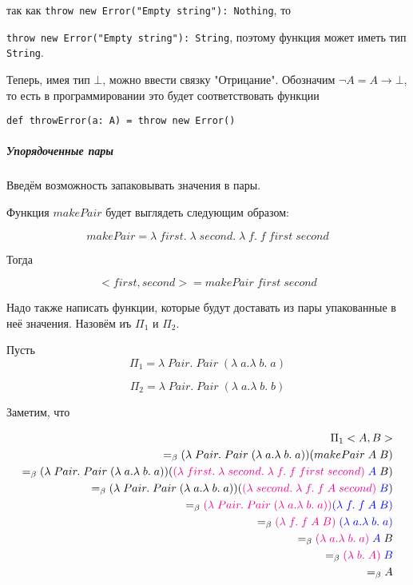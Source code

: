 так как \texttt{throw new Error("Empty string"): Nothing}, то 

\texttt{throw new Error("Empty string"): String}, поэтому функция может иметь тип \texttt{String}.

Теперь, имея тип $\bot$, можно ввести связку "Отрицание". Обозначим $\neg A = A \rightarrow \bot$, то есть в программировании это будет соответствовать функции

\begin{verbatim}
def throwError(a: A) = throw new Error()
\end{verbatim}

\subparagraph{Упорядоченные пары}

Введём возможность запаковывать значения в пары.

Функция $makePair$ будет выглядеть следующим образом:

$$makePair = \lambda \; first. \; \lambda \; second. \; \lambda \; f. \; f \; first \; second$$

Тогда 

$$<first, second> = makePair \; first \; second$$

Надо также написать функции, которые будут доставать из пары упакованные в неё значения. Назовём иъ $\Pi_1$ и $\Pi_2$. 

Пусть 
$$\Pi_1 = \lambda \; Pair. \; Pair \; (\lambda \; a. \lambda \; b. \; a)$$

$$\Pi_2 = \lambda \; Pair. \; Pair \; (\lambda \; a. \lambda \; b. \; b)$$

Заметим, что 

\begin{align*}
	\Pi_1 <A, B> \\
	=_{\beta} (\lambda \; Pair. \; Pair \; (\lambda \; a. \lambda \; b. \; a)) (makePair \; A \; B)\\ =_\beta (\lambda \; Pair. \; Pair \; (\lambda \; a. \lambda \; b. \; a)) (\textcolor{magenta}{(\lambda \; first. \; \lambda \; second. \; \lambda \; f. \; f \; first \; second)} \; \textcolor{blue}{A} \; B) \\ =_\beta (\lambda \; Pair. \; Pair \; (\lambda \; a. \lambda \; b. \; a)) (\textcolor{magenta}{(\lambda \; second. \; \lambda \; f. \; f \; A \; second)} \; \textcolor{blue}{B}) \\ =_\beta \textcolor{magenta}{(\lambda \; Pair. \; Pair \; (\lambda \; a. \lambda \; b. \; a))} \textcolor{blue}{(\lambda \; f. \; f \; A \; B)} \\ =_\beta \textcolor{magenta}{(\lambda \; f. \; f \; A \; B)} \; \textcolor{blue}{(\lambda \; a. \lambda \; b. \; a)} \\ =_\beta \textcolor{magenta}{(\lambda \; a. \lambda \; b. \; a)} \; \textcolor{blue}{A} \; B \\ =_\beta \textcolor{magenta}{(\lambda \; b. \; A)} \; \textcolor{blue}{B} \\ =_\beta A
\end{align*}

